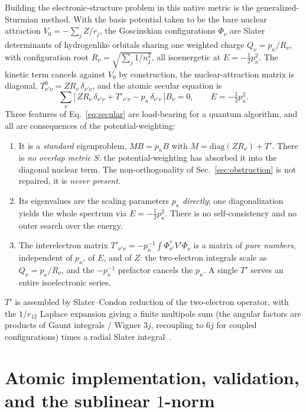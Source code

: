 \documentclass[aps,pra,twocolumn,superscriptaddress,longbibliography]{revtex4-2}
\begin{document}
Building the electronic-structure problem in this native metric is the
generalized-Sturmian method.  With the basis potential taken to be the bare
nuclear attraction $V_0=-\sum_j Z/r_j$, the Goscinskian configurations $\Phi_\nu$
are Slater determinants of hydrogenlike orbitals sharing one weighted charge
$Q_\nu=p_\kappa/R_\nu$, with configuration root
$R_\nu=\sqrt{\sum_j 1/n_j^2}$, all isoenergetic at $E=-\tfrac12 p_\kappa^2$.  The
kinetic term cancels against $V_0$ by construction, the nuclear-attraction matrix
is diagonal, $T^0_{\nu'\nu}=Z R_\nu\,\delta_{\nu'\nu}$, and the atomic secular
equation is~\cite{averyphd,averymsc}
\begin{equation}
\sum_\nu\Big[\,Z R_\nu\,\delta_{\nu'\nu}+T'_{\nu'\nu}-p_\kappa\,\delta_{\nu'\nu}\,\Big]B_\nu=0,
\qquad E=-\tfrac12 p_\kappa^2.
\label{eq:secular}
\end{equation}
Three features of Eq.~\eqref{eq:secular} are load-bearing for a quantum
algorithm, and all are consequences of the potential-weighting:
\begin{enumerate}
\item It is a \emph{standard} eigenproblem, $M B=p_\kappa B$ with
$M=\mathrm{diag}(Z R_\nu)+T'$.  There is \emph{no overlap metric} $S$: the
potential-weighting has absorbed it into the diagonal nuclear term.  The
non-orthogonality of Sec.~\ref{sec:obstruction} is not repaired, it is
\emph{never present}.
\item Its eigenvalues are the scaling parameters $p_\kappa$ \emph{directly};
one diagonalization yields the whole spectrum via $E=-\tfrac12 p_\kappa^2$.
There is no self-consistency and no outer search over the energy.
\item The interelectron matrix $T'_{\nu'\nu}=-p_\kappa^{-1}\!\int
\Phi^*_{\nu'}V'\Phi_\nu$ is a matrix of \emph{pure numbers}, independent of
$p_\kappa$, of $E$, and of $Z$: the two-electron integrals scale as
$Q_\nu=p_\kappa/R_\nu$, and the $-p_\kappa^{-1}$ prefactor cancels the
$p_\kappa$.  A single $T'$ serves an entire isoelectronic series.
\end{enumerate}
$T'$ is assembled by Slater--Condon reduction of the two-electron operator,
with the $1/r_{12}$ Laplace expansion giving a finite multipole sum
(the angular factors are products of Gaunt integrals / Wigner $3j$, recoupling to
$6j$ for coupled configurations) times a radial Slater integral~\cite{averymsc}.

\section{Atomic implementation, validation, and the sublinear $1$-norm}
\label{sec:atomic}
\end{document}
